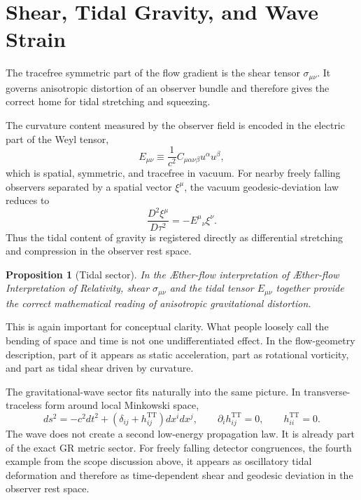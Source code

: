 \documentclass[11pt]{article}
\newcommand{\Aflow}{\AE{}ther-flow}
\newcommand{\TheoryName}{\Aflow{} Interpretation of Relativity}
\newtheorem{proposition}{Proposition}
\begin{document}
\section{Shear, Tidal Gravity, and Wave Strain}

The tracefree symmetric part of the flow gradient is the shear tensor \(\sigma_{\mu\nu}\). It governs anisotropic distortion of an observer bundle and therefore gives the correct home for tidal stretching and squeezing.

The curvature content measured by the observer field is encoded in the electric part of the Weyl tensor,
\begin{equation}
E_{\mu\nu}
\equiv
\frac{1}{c^2}C_{\mu\alpha\nu\beta}u^\alpha u^\beta,
\label{eq:weylelectric}
\end{equation}
which is spatial, symmetric, and tracefree in vacuum. For nearby freely falling observers separated by a spatial vector \(\xi^\mu\), the vacuum geodesic-deviation law reduces to
\begin{equation}
\frac{D^2 \xi^\mu}{D\tau^2}
=
-E^\mu{}_{\nu}\xi^\nu.
\label{eq:geodesicdeviation}
\end{equation}
Thus the tidal content of gravity is registered directly as differential stretching and compression in the observer rest space.

\begin{proposition}[Tidal sector]
In the \Aflow{} interpretation of \TheoryName{}, shear \(\sigma_{\mu\nu}\) and the tidal tensor \(E_{\mu\nu}\) together provide the correct mathematical reading of anisotropic gravitational distortion.
\end{proposition}

This is again important for conceptual clarity. What people loosely call the bending of space and time is not one undifferentiated effect. In the flow-geometry description, part of it appears as static acceleration, part as rotational vorticity, and part as tidal shear driven by curvature.

The gravitational-wave sector fits naturally into the same picture. In transverse-traceless form around local Minkowski space,
\begin{equation}
ds^2
=
-c^2dt^2
+
\left(\delta_{ij}+h^{\mathrm{TT}}_{ij}\right)dx^i dx^j,
\qquad
\partial_i h^{\mathrm{TT}}_{ij}=0,
\qquad
h^{\mathrm{TT}}_{ii}=0.
\label{eq:ttmetric}
\end{equation}
The wave does not create a second low-energy propagation law. It is already part of the exact GR metric sector. For freely falling detector congruences, the fourth example from the scope discussion above, it appears as oscillatory tidal deformation and therefore as time-dependent shear and geodesic deviation in the observer rest space.
\end{document}
